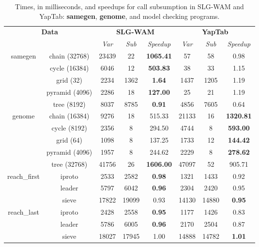 \begin{table}[ht]
\centering
\footnotesize{
  \begin{tabular}{cc|ccc|ccc}
   \hline
    \hline
    \multicolumn{2}{c|}{\multirow{2}{*}{\small{\textbf{Data}}}} & \multicolumn{3}{c|}{\small{\textbf{SLG-WAM}}} & \multicolumn{3}{c}{\small{\textbf{YapTab}}} \\
     \multicolumn{2}{c|}{} & \textit{Var} & \textit{Sub} & \textit{Speedup} & \textit{Var} & \textit{Sub} & \textit{Speedup} \\
   \hline
   \hline
   
   \multirow{5}{*}{samegen} &  \scriptsize{chain  (32768) }  &  23439 & 22 &  \textbf{1065.41}  & 57 & 58 &  0.98 \\
   &  \scriptsize{cycle  (16384) }  &  6046 & 12 &  \textbf{503.83}  & 38 & 33 &  1.15 \\
   &  \scriptsize{grid  (32) }  &  2234 & 1362 &  \textbf{1.64}  & 1437 & 1205 &  1.19 \\
   &  \scriptsize{pyramid  (4096) }  &  2286 & 18 &  \textbf{127.00}  & 25 & 21 &  1.19 \\
   &  \scriptsize{tree  (8192) }  &  8037 & 8785 &  \textbf{0.91}  & 4856 & 7605 &  0.64 \\
   \hline
   
   \multirow{5}{*}{genome} &  \scriptsize{chain  (16384) }  &  9276 & 18 &  515.33  & 21133 & 16 &  \textbf{1320.81} \\
   &  \scriptsize{cycle  (8192) }  &  2356 & 8 &  294.50  & 4744 & 8 &  \textbf{593.00} \\
   &  \scriptsize{grid  (64) }  &  1098 & 8 &  137.25  & 1733 & 12 &  \textbf{144.42} \\
   &  \scriptsize{pyramid  (4096) }  &  1957 & 8 &  244.62  & 2229 & 8 &  \textbf{278.62} \\
   &  \scriptsize{tree  (32768) }  &  41756 & 26 &  \textbf{1606.00}  & 47097 & 52 &  905.71 \\
   \hline

   \multirow{3}{*}{reach\_first} &  \scriptsize{iproto }  &  2533 & 2582 &  \textbf{0.98}  & 1321 & 1433 &  0.92 \\
   &  \scriptsize{leader }  &  5797 & 6042 &  \textbf{0.96}  & 2304 & 2420 &  0.95 \\
   &  \scriptsize{sieve }  &  17822 & 19099 &  0.93  & 14130 & 14880 &  \textbf{0.95} \\
   \hline
   \multirow{3}{*}{reach\_last} &  \scriptsize{iproto }  &  2428 & 2558 &  \textbf{0.95}  & 1177 & 1426 &  0.83 \\
   &  \scriptsize{leader }  &  5786 & 6005 &  \textbf{0.96}  & 2170 & 2504 &  0.87 \\
   &  \scriptsize{sieve }  &  18027 & 17945 &  1.00  & 14888 & 14782 &  \textbf{1.01} \\
   \hline
\hline
\end{tabular}
}
\caption{Times, in milliseconds, and speedups for call subsumption in SLG-WAM and YapTab: \textbf{samegen}, \textbf{genome}, and model checking programs.}
\label{tbl:result_detail_others}
\end{table}
